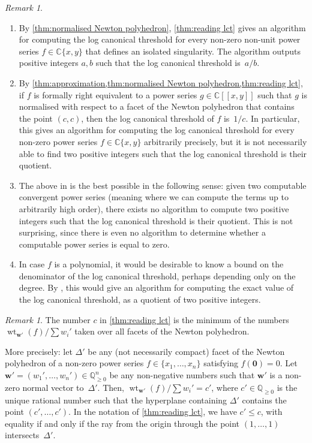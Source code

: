 \documentclass[a4paper, 12pt, oneside]{article}
\theoremstyle{plain}
\theoremstyle{definition}
\theoremstyle{remark}
\newtheorem{remark}[theorem]{Remark}
\numberwithin{theorem}{section}
\numberwithin{table}{section}
\numberwithin{equation}{theorem}
\begin{document}
\begin{remark} \label{rem:algorithm}
\begin{enumerate}[label=(\alph*), ref=\alph*]
\item By \cref{thm:normalised Newton polyhedron}, \cref{thm:reading lct} gives an algorithm for computing the log canonical threshold for every non-zero non-unit power series $f \in \mathbb C\{x, y\}$ that defines an isolated singularity. The algorithm outputs positive integers $a, b$ such that the log canonical threshold is~$a/b$.
\item \label{itm:algorithm up to arbitrary precision} By \cref{thm:approximation,thm:normalised Newton polyhedron,thm:reading lct}, if $f$ is formally right equivalent to a power series $g \in \mathbb C[[x, y]]$ such that $g$ is normalised with respect to a facet of the Newton polyhedron that contains the point $(c, c)$, then the log canonical threshold of $f$ is~$1/c$. In particular, this gives an algorithm for computing the log canonical threshold for every non-zero power series $f \in \mathbb C\{x, y\}$ arbitrarily precisely, but it is not necessarily able to find two positive integers such that the log canonical threshold is their quotient.
\item The above in  is the best possible in the following sense: given two computable convergent power series (meaning where we can compute the terms up to arbitrarily high order), there exists no algorithm to compute two positive integers such that the log canonical threshold is their quotient. This is not surprising, since there is even no algorithm to determine whether a computable power series is equal to zero.
\item In case $f$ is a polynomial, it would be desirable to know a bound on the denominator of the log canonical threshold, perhaps depending only on the degree. By , this would give an algorithm for computing the exact value of the log canonical threshold, as a quotient of two positive integers.
\end{enumerate}
\end{remark}

\begin{remark}
The number $c$ in \cref{thm:reading lct} is the minimum of the numbers $\operatorname{wt}_{\bm w'}(f) / \sum w_i'$ taken over all facets of the Newton polyhedron.

More precisely: let $\Delta'$ be any (not necessarily compact) facet of the Newton polyhedron of a non-zero power series $f \in \{x_1, \ldots, x_n\}$ satisfying $f(\bm 0) = 0$. Let $\bm w' = (w_1', \ldots, w_n') \in \mathbb Q_{\geq0}^n$ be any non-negative numbers such that $\bm w'$ is a non-zero normal vector to~$\Delta'$. Then, $\operatorname{wt}_{\bm w'}(f) / \sum w_i' = c'$, where $c' \in \mathbb Q_{\geq0}$ is the unique rational number such that the hyperplane containing $\Delta'$ contains the point $(c', \ldots, c')$. In the notation of \cref{thm:reading lct}, we have $c' \leq c$, with equality if and only if the ray from the origin through the point $(1, \ldots, 1)$ intersects~$\Delta'$.
\end{remark}
\end{document}
